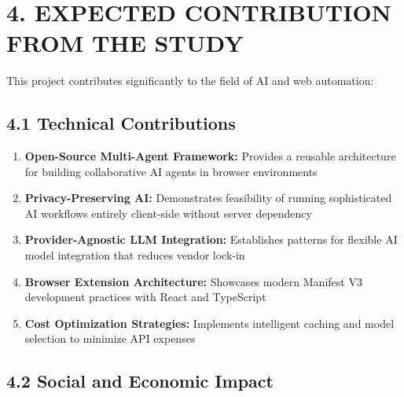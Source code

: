 \documentclass[12pt,a4paper]{article}
\begin{document}
\newpage

\section*{\textbf{4. EXPECTED CONTRIBUTION FROM THE STUDY}}

This project contributes significantly to the field of AI and web automation:

\vspace{0.3cm}

\subsection*{\textbf{4.1 Technical Contributions}}

\begin{enumerate}
    \item \textbf{Open-Source Multi-Agent Framework:} Provides a reusable architecture for building collaborative AI agents in browser environments
    
    \item \textbf{Privacy-Preserving AI:} Demonstrates feasibility of running sophisticated AI workflows entirely client-side without server dependency
    
    \item \textbf{Provider-Agnostic LLM Integration:} Establishes patterns for flexible AI model integration that reduces vendor lock-in
    
    \item \textbf{Browser Extension Architecture:} Showcases modern Manifest V3 development practices with React and TypeScript
    
    \item \textbf{Cost Optimization Strategies:} Implements intelligent caching and model selection to minimize API expenses
\end{enumerate}

\subsection*{\textbf{4.2 Social and Economic Impact}}
\end{document}
